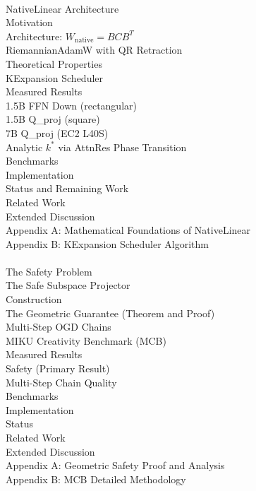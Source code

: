 \documentclass[11pt]{article}
\begin{document}
\vspace{6pt}
\\
\quad NativeLinear Architecture\\
\quad \quad Motivation\\
\quad \quad Architecture: $W_{\mathrm{native}} = B C B^T$\\
\quad \quad RiemannianAdamW with QR Retraction\\
\quad \quad Theoretical Properties\\
\quad KExpansion Scheduler\\
\quad Measured Results\\
\quad \quad 1.5B FFN Down (rectangular)\\
\quad \quad 1.5B Q\_proj (square)\\
\quad \quad 7B Q\_proj (EC2 L40S)\\
\quad Analytic $k^*$ via AttnRes Phase Transition\\
\quad Benchmarks\\
\quad Implementation\\
\quad Status and Remaining Work\\
\quad Related Work\\
\quad Extended Discussion\\
\quad Appendix A: Mathematical Foundations of NativeLinear\\
\quad Appendix B: KExpansion Scheduler Algorithm\\

\vspace{6pt}
\\
\quad The Safety Problem\\
\quad The Safe Subspace Projector\\
\quad \quad Construction\\
\quad \quad The Geometric Guarantee (Theorem and Proof)\\
\quad Multi-Step OGD Chains\\
\quad MIKU Creativity Benchmark (MCB)\\
\quad Measured Results\\
\quad \quad Safety (Primary Result)\\
\quad \quad Multi-Step Chain Quality\\
\quad Benchmarks\\
\quad Implementation\\
\quad Status\\
\quad Related Work\\
\quad Extended Discussion\\
\quad Appendix A: Geometric Safety Proof and Analysis\\
\quad Appendix B: MCB Detailed Methodology\\
\end{document}
